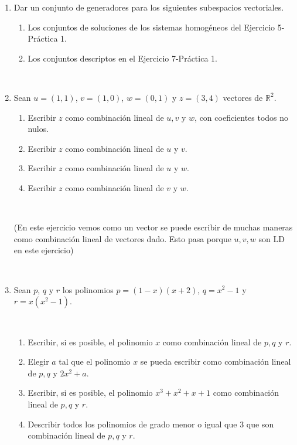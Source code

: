 \documentclass[12pt]{amsart}
\begin{document}
\begin{enumerate}

\item\label{practicos anteriores} Dar un conjunto de generadores para los siguientes subespacios vectoriales.

\begin{enumerate}
\item Los conjuntos de soluciones de los sistemas homog\'eneos del Ejercicio 5-Pr\'actica 1.
\item Los conjuntos descriptos en el Ejercicio 7-Pr\'actica 1.
\end{enumerate}

\

\item Sean $u=(1,1)$, $v=(1,0)$, $w=(0,1)$ y $z=(3,4)$ vectores de $\mathbb{R}^2$.
\begin{enumerate}
\item Escribir $z$ como combinaci\'on lineal de $u,v$ y $w$, con coeficientes todos no nulos.
\item Escribir $z$ como combinaci\'on lineal de $u$ y $v$.
\item Escribir $z$ como combinaci\'on lineal de $u$ y $w$.
\item Escribir $z$ como combinaci\'on lineal de $v$ y $w$.
\end{enumerate}

\

(En este ejercicio vemos como un vector se puede escribir de muchas maneras como combinaci\'on lineal de vectores dado. Esto pasa porque $u,v,w$ son LD en este ejercicio)

\
		
\item Sean $p$, $q$ y $r$ los polinomios $p=(1-x)(x+2)$, $q=x^2-1$ y $r=x(x^2-1)$.

\

\begin{enumerate}
			\item Escribir, si es posible, el polinomio $x$ como combinaci\'on lineal de $p,q$ y $r$.
			\item Elegir $a$ tal que el polinomio $x$ se pueda escribir como combinaci\'on lineal de $p,q$ y $2x^2+a$.
			\item Escribir, si es posible, el polinomio $x^3+x^2+x+1$ como combinaci\'on lineal de $p,q$ y $r$.
			\item Describir todos los polinomios de grado menor o igual que $3$ que son combinaci\' on lineal de $p,q$ y $r$.
 \end{enumerate}



\end{enumerate}
\end{document}
